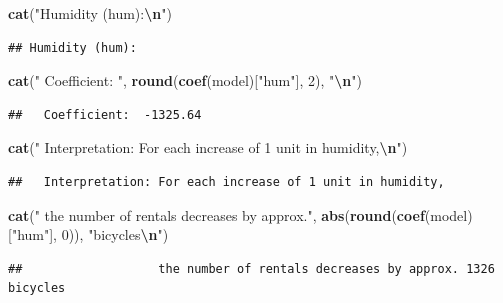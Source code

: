 \documentclass[
]{article}
\newenvironment{Shaded}{\begin{snugshade}}{\end{snugshade}}
\newcommand{\DecValTok}[1]{\textcolor[rgb]{0.00,0.00,0.81}{#1}}
\newcommand{\FunctionTok}[1]{\textcolor[rgb]{0.13,0.29,0.53}{\textbf{#1}}}
\newcommand{\NormalTok}[1]{#1}
\newcommand{\SpecialCharTok}[1]{\textcolor[rgb]{0.81,0.36,0.00}{\textbf{#1}}}
\newcommand{\StringTok}[1]{\textcolor[rgb]{0.31,0.60,0.02}{#1}}
\begin{document}
\begin{Shaded}
\begin{Highlighting}[]
\FunctionTok{cat}\NormalTok{(}\StringTok{"Humidity (hum):}\SpecialCharTok{\textbackslash{}n}\StringTok{"}\NormalTok{)}
\end{Highlighting}
\end{Shaded}

\begin{verbatim}
## Humidity (hum):
\end{verbatim}

\begin{Shaded}
\begin{Highlighting}[]
\FunctionTok{cat}\NormalTok{(}\StringTok{"  Coefficient: "}\NormalTok{, }\FunctionTok{round}\NormalTok{(}\FunctionTok{coef}\NormalTok{(model)[}\StringTok{"hum"}\NormalTok{], }\DecValTok{2}\NormalTok{), }\StringTok{"}\SpecialCharTok{\textbackslash{}n}\StringTok{"}\NormalTok{)}
\end{Highlighting}
\end{Shaded}

\begin{verbatim}
##   Coefficient:  -1325.64
\end{verbatim}

\begin{Shaded}
\begin{Highlighting}[]
\FunctionTok{cat}\NormalTok{(}\StringTok{"  Interpretation: For each increase of 1 unit in humidity,}\SpecialCharTok{\textbackslash{}n}\StringTok{"}\NormalTok{)}
\end{Highlighting}
\end{Shaded}

\begin{verbatim}
##   Interpretation: For each increase of 1 unit in humidity,
\end{verbatim}

\begin{Shaded}
\begin{Highlighting}[]
\FunctionTok{cat}\NormalTok{(}\StringTok{"                  the number of rentals decreases by approx."}\NormalTok{, }\FunctionTok{abs}\NormalTok{(}\FunctionTok{round}\NormalTok{(}\FunctionTok{coef}\NormalTok{(model)[}\StringTok{"hum"}\NormalTok{], }\DecValTok{0}\NormalTok{)), }\StringTok{"bicycles}\SpecialCharTok{\textbackslash{}n}\StringTok{"}\NormalTok{)}
\end{Highlighting}
\end{Shaded}

\begin{verbatim}
##                   the number of rentals decreases by approx. 1326 bicycles
\end{verbatim}
\end{document}
